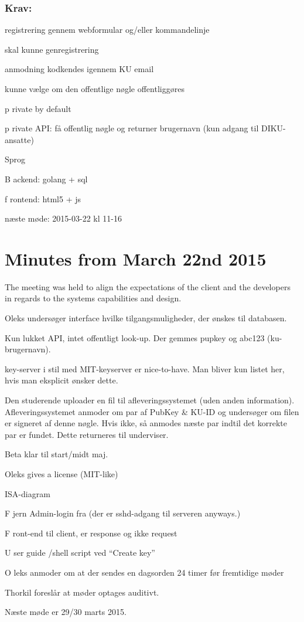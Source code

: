 \documentclass[11pt,a4paper]{report}
\let\OldItem\item
\newcommand{\SubItemStart}[1]{%
    \let\item\SubItemEnd
    \begin{SubItemList}[resume]%
        \OldItem #1%
}
\newcommand{\SubItemMiddle}[1]{%
    \OldItem #1%
}
\newcommand{\SubItemEnd}[1]{%
    \end{SubItemList}%
    \let\item\OldItem
    \item #1%
}
\newcommand*{\SubItem}[1]{%
    \let\SubItem\SubItemMiddle%
    \SubItemStart{#1}%
}%
\begin{document}
\begin{appendices}
\subsubsection{Krav:}
\begin{itemize}
\item registrering gennem webformular og/eller kommandelinje
\item skal kunne genregistrering
\item anmodning kodkendes igennem KU email
\item kunne vælge om den offentlige nøgle offentliggøres
\SubItem private by default
\item private API: få offentlig nøgle og returner brugernavn (kun adgang til DIKU-ansatte)
\item Sprog
\SubItem Backend: golang + sql
\SubItem frontend: html5 + js
\end{itemize}

næste møde:
2015-03-22 kl 11-16

\section{Minutes from March 22nd 2015}
The meeting was held to align the expectations of the client and the developers in regards to the systems capabilities and design.

\begin{itemize}
\item Oleks undersøger interface hvilke tilgangsmuligheder, der ønskes til databasen.
\item Kun lukket API, intet offentligt look-up. Der gemmes pupkey og abc123 (ku-brugernavn).
\item key-server i stil med MIT-keyserver er nice-to-have. Man bliver kun listet her, hvis man eksplicit ønsker dette.
\item Den studerende uploader en fil til afleveringssystemet (uden anden information). Afleveringssystemet anmoder om par af PubKey \& KU-ID og undersøger om filen er signeret af denne nøgle. Hvis ikke, så anmodes næste par indtil det korrekte par er fundet. Dette returneres til underviser.
\item Beta klar til start/midt maj.
\item Oleks gives a license (MIT-like)
\item ISA-diagram
\SubItem Fjern Admin-login fra (der er sshd-adgang til serveren anyways.)
\SubItem Front-end til client, er response og ikke request
\SubItem User guide /shell script ved ``Create key''
\item Oleks anmoder om at der sendes en dagsorden 24 timer før fremtidige møder
\item Thorkil foreslår at møder optages auditivt.
\end{itemize}

Næste møde er 29/30 marts 2015.
\end{appendices}
\end{document}
